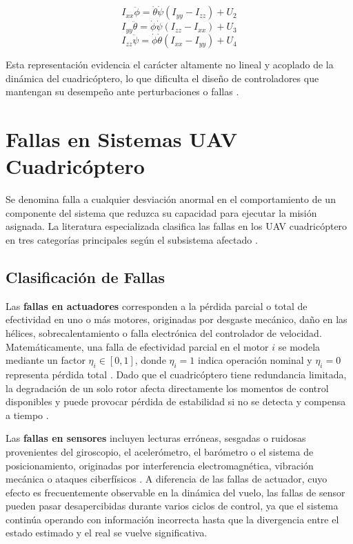 \begin{equation}
I_{xx}\ddot{\phi} = \dot{\theta}\dot{\psi}(I_{yy} - I_{zz}) + U_2
\end{equation}
\begin{equation}
I_{yy}\ddot{\theta} = \dot{\phi}\dot{\psi}(I_{zz} - I_{xx}) + U_3
\end{equation}
\begin{equation}
I_{zz}\ddot{\psi} = \dot{\phi}\dot{\theta}(I_{xx} - I_{yy}) + U_4
\end{equation}

\noindent Esta representación evidencia el carácter altamente no lineal y acoplado de la dinámica del cuadricóptero, lo que dificulta el diseño de controladores que mantengan su desempeño ante perturbaciones o fallas \cite{du2023, wang2022}.


\section{Fallas en Sistemas UAV Cuadricóptero}

Se denomina falla a cualquier desviación anormal en el comportamiento de un componente del sistema que reduzca su capacidad para ejecutar la misión asignada. La literatura especializada clasifica las fallas en los UAV cuadricóptero en tres categorías principales según el subsistema afectado \cite{fdd2021survey, quadcopter2024}.

\subsection{Clasificación de Fallas}

Las \textbf{fallas en actuadores} corresponden a la pérdida parcial o total de efectividad en uno o más motores, originadas por desgaste mecánico, daño en las hélices, sobrecalentamiento o falla electrónica del controlador de velocidad. Matemáticamente, una falla de efectividad parcial en el motor $i$ se modela mediante un factor $\eta_i \in [0, 1]$, donde $\eta_i = 1$ indica operación nominal y $\eta_i = 0$ representa pérdida total \cite{amoozgar2013, du2023}. Dado que el cuadricóptero tiene redundancia limitada, la degradación de un solo rotor afecta directamente los momentos de control disponibles y puede provocar pérdida de estabilidad si no se detecta y compensa a tiempo \cite{kim2025}.

Las \textbf{fallas en sensores} incluyen lecturas erróneas, sesgadas o ruidosas provenientes del giroscopio, el acelerómetro, el barómetro o el sistema de posicionamiento, originadas por interferencia electromagnética, vibración mecánica o ataques ciberfísicos \cite{patan2022, bekhiti2025}. A diferencia de las fallas de actuador, cuyo efecto es frecuentemente observable en la dinámica del vuelo, las fallas de sensor pueden pasar desapercibidas durante varios ciclos de control, ya que el sistema continúa operando con información incorrecta hasta que la divergencia entre el estado estimado y el real se vuelve significativa.

